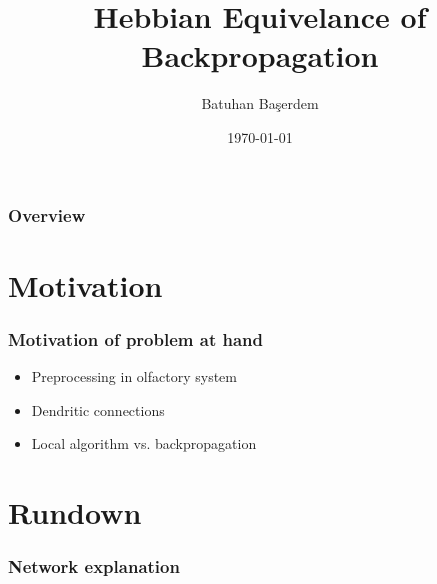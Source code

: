 \documentclass{beamer}
\title[Local Backprop]{Hebbian Equivelance of Backpropagation}
\author{Batuhan Başerdem}
\institute[SBU & CSHL]{
Cold Spring Harbor Labs \\ %
\medskip
\textit{bbaserde@cshl.edu} %
}
\date{\today} %
\begin{document}
\begin{frame}
\titlepage %
\end{frame}

\begin{frame}
\frametitle{Overview} %
\tableofcontents %
\end{frame}


\section{Motivation}

\begin{frame}
	\frametitle{Motivation of problem at hand}
	\begin{itemize}
		\item Preprocessing in olfactory system
		\item Dendritic connections
		\item Local algorithm vs. backpropagation
	\end{itemize}
\end{frame}

\section{Rundown}

\begin{frame}
	\frametitle{Network explanation}
\end{frame}
\end{document}
